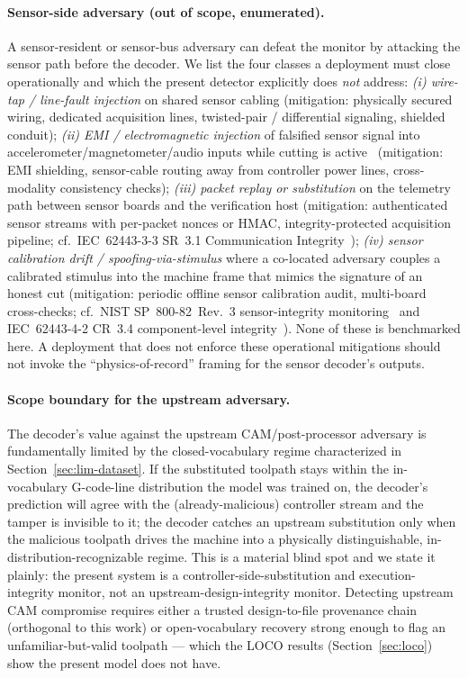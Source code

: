 \documentclass[sensors,article,submit,moreauthors,pdftex]{Definitions/mdpi}
\begin{document}
\paragraph{Sensor-side adversary (out of scope, enumerated).} A sensor-resident or sensor-bus adversary can defeat the monitor by attacking the sensor path before the decoder. We list the four classes a deployment must close operationally and which the present detector explicitly does \emph{not} address: \emph{(i) wire-tap / line-fault injection} on shared sensor cabling (mitigation: physically secured wiring, dedicated acquisition lines, twisted-pair / differential signaling, shielded conduit); \emph{(ii) EMI / electromagnetic injection} of falsified sensor signal into accelerometer/magnetometer/audio inputs while cutting is active~\cite{nist2023sp80082} (mitigation: EMI shielding, sensor-cable routing away from controller power lines, cross-modality consistency checks); \emph{(iii) packet replay or substitution} on the telemetry path between sensor boards and the verification host (mitigation: authenticated sensor streams with per-packet nonces or HMAC, integrity-protected acquisition pipeline; cf.\ IEC~62443-3-3 SR~3.1 Communication Integrity~\cite{iec62443-3-3}); \emph{(iv) sensor calibration drift / spoofing-via-stimulus} where a co-located adversary couples a calibrated stimulus into the machine frame that mimics the signature of an honest cut (mitigation: periodic offline sensor calibration audit, multi-board cross-checks; cf.\ NIST SP~800-82~Rev.~3 sensor-integrity monitoring~\cite{nist2023sp80082} and IEC~62443-4-2 CR~3.4 component-level integrity~\cite{iec62443-4-2}). None of these is benchmarked here. A deployment that does not enforce these operational mitigations should not invoke the ``physics-of-record'' framing for the sensor decoder's outputs.

\paragraph{Scope boundary for the upstream adversary.} The decoder's value against the upstream CAM/post-processor adversary is fundamentally limited by the closed-vocabulary regime characterized in Section~\ref{sec:lim-dataset}. If the substituted toolpath stays within the in-vocabulary G-code-line distribution the model was trained on, the decoder's prediction will agree with the (already-malicious) controller stream and the tamper is invisible to it; the decoder catches an upstream substitution only when the malicious toolpath drives the machine into a physically distinguishable, in-distribution-recognizable regime. This is a material blind spot and we state it plainly: the present system is a controller-side-substitution and execution-integrity monitor, not an upstream-design-integrity monitor. Detecting upstream CAM compromise requires either a trusted design-to-file provenance chain (orthogonal to this work) or open-vocabulary recovery strong enough to flag an unfamiliar-but-valid toolpath --- which the LOCO results (Section~\ref{sec:loco}) show the present model does not have.
\end{document}
